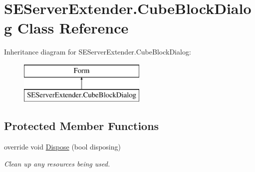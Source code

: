 \hypertarget{class_s_e_server_extender_1_1_cube_block_dialog}{}\section{S\+E\+Server\+Extender.\+Cube\+Block\+Dialog Class Reference}
\label{class_s_e_server_extender_1_1_cube_block_dialog}
Inheritance diagram for S\+E\+Server\+Extender.\+Cube\+Block\+Dialog\+:\begin{figure}[H]
\begin{center}
\leavevmode
\includegraphics[height=2.000000cm]{class_s_e_server_extender_1_1_cube_block_dialog}
\end{center}
\end{figure}
\subsection*{Protected Member Functions}
\begin{DoxyCompactItemize}
\item 
override void \hyperlink{class_s_e_server_extender_1_1_cube_block_dialog_a1e343d4e879fb6c3d1a53f8b4f1edb9a}{Dispose} (bool disposing)
\begin{DoxyCompactList}\small\item\em Clean up any resources being used. \end{DoxyCompactList}\end{DoxyCompactItemize}

